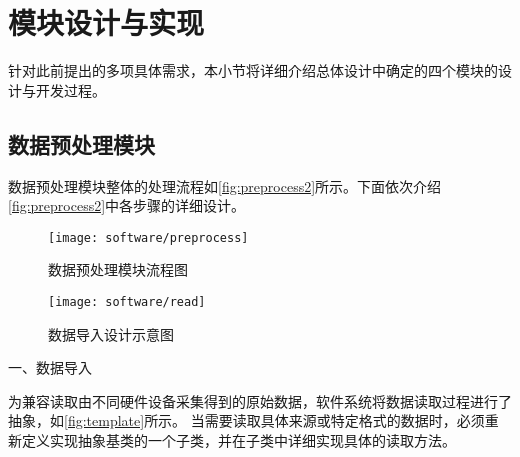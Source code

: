 
\section{模块设计与实现}

针对此前提出的多项具体需求，本小节将详细介绍总体设计中确定的四个模块的设计与开发过程。
\subsection{数据预处理模块}

数据预处理模块整体的处理流程如\autoref{fig:preprocess2}所示。下面依次介绍\autoref{fig:preprocess2}中各步骤的详细设计。
\begin{figure}[htbp]
    \centering
    \texttt{[image: software/preprocess]}
    \caption{\label{fig:preprocess2}数据预处理模块流程图}
\end{figure}
\begin{figure}[htbp]
    \centering
    \texttt{[image: software/read]}
    \caption{\label{fig:template}数据导入设计示意图}
\end{figure}
一、数据导入

为兼容读取由不同硬件设备采集得到的原始数据，软件系统将数据读取过程进行了抽象，如\autoref{fig:template}所示。
当需要读取具体来源或特定格式的数据时，必须重新定义实现抽象基类的一个子类，并在子类中详细实现具体的读取方法。


